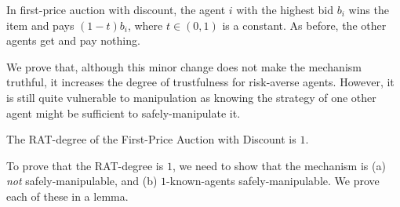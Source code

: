 In first-price auction with discount, the agent $i$ with the highest bid $b_i$ wins the item and pays $(1-t)b_i$, where $t\in(0,1)$ is a constant. As before, the other agents get and pay nothing. 



We prove that, although this minor change does not make the  mechanism truthful, it increases the degree of trustfulness for risk-averse agents. 
However, it is still quite vulnerable to manipulation as knowing the strategy of one other agent might be sufficient to safely-manipulate it.

\begin{theorem}
\label{auction-with-discount}
The RAT-degree of the First-Price Auction with Discount is $1$.
\end{theorem}


To prove that the RAT-degree is $1$, we need to show that the mechanism is (a) \emph{not} safely-manipulable, and (b) 
$1$-known-agents safely-manipulable.
We prove each of these in a lemma.

